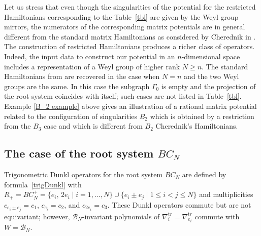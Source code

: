 \documentclass[12pt]{amsart}
\numberwithin{equation}{section}
\theoremstyle{definition}
\begin{document}
Let us stress that even though the singularities of the potential for the restricted Hamiltonians corresponding to the Table~\ref{tbl} are given by the 
Weyl
group mirrors, the numerators of the corresponding matrix potentials are in general different from the standard matrix 
Hamiltonians as considered by Cherednik in \cite{Ch2}. The construction of restricted Hamiltonians produces a richer class of operators. Indeed, the input data to construct our potential in an $n$-dimensional space includes a representation of a Weyl group of higher rank $N \ge n$. The standard Hamiltonians from \cite{Ch2} are recovered in the case when $N=n$ and the two Weyl groups are the same. In this case the subgraph $\Gamma_0$ is empty and the projection of the root system coincides with itself; such cases are not listed in Table~\ref{tbl}. Example \ref{B_2 example} above gives an illustration of a rational matrix potential related to the configuration of singularities $B_2$ which is  obtained by a restriction from the $B_3$ case and which is different from $B_2$ Cherednik's Hamiltonians. 


\subsection{The case of the root system $BC_N$} \label{BC}
Trigonometric Dunkl operators for the root system $BC_N$ are defined by formula~\eqref{trigDunkl} with $R_+ = BC_N^+ = \{e_i, \, 2e_i \mid i=1, \dots, N\} \cup \{e_i \pm e_j \mid 1 \leq i < j \leq N \}$ and multiplicities $c_{e_i \pm e_j} = c_1$, $c_{e_i} = c_2$, and $c_{2e_i} = c_3$. These Dunkl operators commute but are not equivariant; however, $\mathcal{B}_N$-invariant polynomials of $\nabla_i^{\mathrm tr} = \nabla_{e_i}^{\mathrm tr}$ commute with $W = \mathcal{B}_N$.
\end{document}
